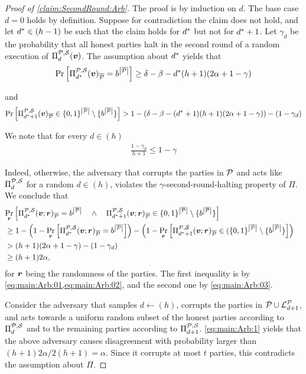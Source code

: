 \begin{proof}[Proof of \cref{claim:SecondRound:Arb}]
The proof is by induction on $d$. The base case $d=0$ holds by definition. Suppose for contradiction the claim does not hold, and let ${d^\ast}\in(h-1)$
be such that the claim holds for ${d^\ast}$ but not for ${d^\ast}+1$. Let $\gamma_d$ be the probability that all honest parties halt in the second round of a random execution of $\Pi^{\mathcal{P},\mathcal{S}}_d({ \boldsymbol{v}})$. The assumption about ${d^\ast}$ yields that
\begin{align}\label{eq:main:Arb:01}
\Pr_{}\left[\Pi^{\mathcal{P},\mathcal{S}}_{d^\ast}({ \boldsymbol{v}})_{\overline{\mathcal{P}}} = b^{\left|{\overline{\mathcal{P}}}\right|}\right] \ge \delta- \beta- {d^\ast} (h+1)(2\alpha + 1-\gamma)
\end{align}

and
\begin{align}\label{eq:main:Arb:02}
\Pr_{}\left[\Pi^{\mathcal{P},\mathcal{S}}_{{d^\ast}+1}({ \boldsymbol{v}})_{\overline{\mathcal{P}}} \in \{0,1\}^{\left|{\overline{\mathcal{P}}}\right|} \setminus \{b^{\left|{\overline{\mathcal{P}}}\right|}\}\right] > 1-\left(\delta - \beta - ({d^\ast}+1) (h+1)(2\alpha + 1-\gamma)\right)- (1-\gamma_d)
\end{align}


We note that for every $d\in (h)$
\begin{align}\label{eq:main:Arb:03}
\frac{1- \gamma_d}{h+1} \le 1-\gamma
\end{align}


Indeed, otherwise, the adversary that corrupts the parties in $\mathcal{P}$ and acts like $\Pi^{\mathcal{P},\mathcal{S}}_d$ for a random $d\in (h)$, violates the $\gamma$-second-round-halting property of $\Pi$. We conclude that
\begin{align}\label{eq:main:Arb:1}
\lefteqn{\ppr{\vr}{\PP_\ds(\vv;\vr)_\oP = \o^{\size{\oP}} \qand \PP_{\ds+1}(\vv;\vr)_\oP \in \zo^{\size{\oP}} \setminus \sset{\o^{\size{\oP}}}}}\\
& \ge 1 - \left(1- \ppr{\vr}{\PP_\ds(\vv;\vr)_\oP = \o^{\size{\oP}}} \right) - \left(1- \ppr{\vr}{\PP_{\ds+1}(\vv;\vr)_\oP \in (\zo^{\size{\oP}} \setminus \sset{\o^{\size{\oP}}}}\right)\nonumber\\
& > (h+1) (2\alpha + 1 - \gamma) - (1-\gamma_d) \nonumber\\
& \ge (h+1) 2\alpha,\nonumber
\end{align}
for ${ \boldsymbol{r}}$ being the randomness of the parties. The first inequality is by \cref{eq:main:Arb:01,eq:main:Arb:02}, and the second one by \cref{eq:main:Arb:03}.

Consider the adversary that samples $d\gets (h)$, corrupts the parties in $\mathcal{P} \cup {\cal{L}}^{\mathcal{P}}_{d+1}$, and acts towards a uniform random subset of the honest parties according to $\Pi^{\mathcal{P},\mathcal{S}}_d$ and to the remaining parties according to $\Pi^{\mathcal{P},\mathcal{S}}_{d+1}$. \cref{eq:main:Arb:1} yields that the above adversary causes disagreement with probability larger than $(h+1) 2\alpha/2(h+1) = \alpha$. Since it corrupts at most $t$ parties, this contradicts the assumption about $\Pi$.
\end{proof}




